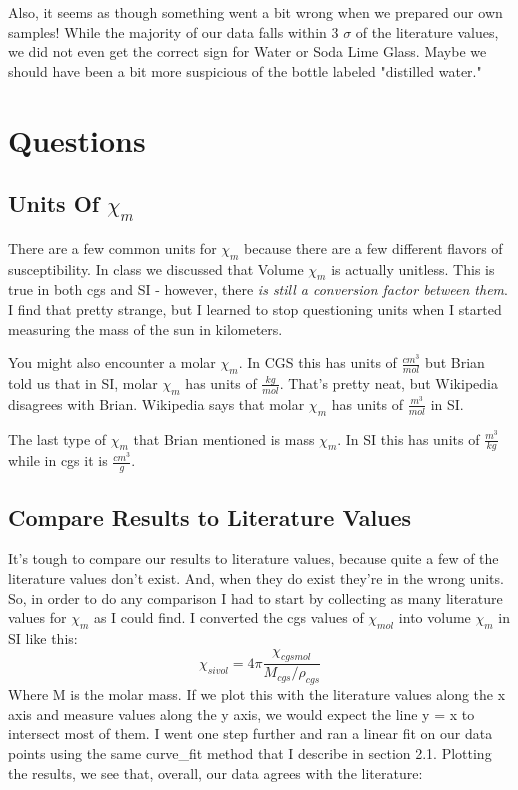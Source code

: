 \documentclass{article}
\begin{document}
Also, it seems as though something went a bit wrong when we prepared our own
samples! While the majority of our data falls within 3 $\sigma$ of the
literature values, we did not even get the correct sign for Water or Soda Lime
Glass. Maybe we should have been a bit more suspicious of the bottle labeled
"distilled water."



\section{Questions}
\subsection{Units Of $\chi_m$}

There are a few common units for $\chi_m$ because there are a few different
flavors of susceptibility. In class we discussed that Volume $\chi_m$ is
actually unitless. This is true in both cgs and SI - however, there \textit{is
    still a conversion factor between them}. I find that pretty strange, but I
learned to stop questioning units when I started measuring the mass of the sun
in kilometers.

You might also encounter a molar $\chi_m$. In CGS this has units of
$\frac{cm^3}{mol}$ but Brian told us that in SI, molar $\chi_m$ has units of
$\frac{kg}{mol}$. That's pretty neat, but Wikipedia disagrees with Brian.
Wikipedia says that molar $\chi_m$ has units of $\frac{m^3}{mol}$ in SI.

The last type of $\chi_m$ that Brian mentioned is mass $\chi_m$. In SI this has
units of $\frac{m^3}{kg}$ while in cgs it is $\frac{cm^3}{g}$.

\subsection{Compare Results to Literature Values}
It's tough to compare our results to literature values, because quite a few of
the literature values don't exist. And, when they do exist they're in the wrong
units. So, in order to do any comparison I had to start by collecting as many
literature values for $\chi_m$ as I could find. I converted the cgs values of
$\chi_{mol}$ into volume $\chi_m$ in SI like this:
$$\chi_{sivol} = 4 \pi\frac{\chi_{cgsmol}}{M_{cgs} / \rho_{cgs}} $$
Where M is the molar mass. If we plot this with the literature values along the
x axis and measure values along the y axis, we would expect the line y = x to
intersect most of them. I went one step further and ran a linear fit on our
data points using the same curve\_fit method that I describe in section 2.1.
Plotting the results, we see that, overall, our data agrees with the
literature:
\end{document}

